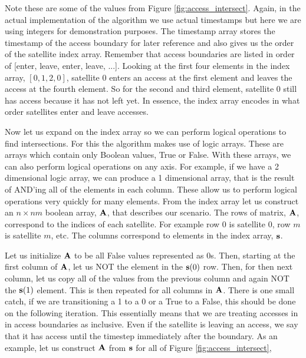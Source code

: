 Note these are some of the values from Figure \ref{fig:access_intersect}.
Again, in the actual implementation of the algorithm we use actual timestamps
but here we are using integers for demonstration purposes. The timestamp array
stores the timestamp of the access boundary for later reference and also gives
us the order of the satellite index array. Remember that access boundaries are
listed in order of [enter, leave, enter, leave, ...]. Looking at the first four
elements in the index array, $[0, 1, 2, 0]$, satellite 0 enters an access at
the first element and leaves the access at the fourth element. So for the
second and third element, satellite 0 still has access because it has not left
yet. In essence, the index array encodes in what order satellites enter and
leave accesses. 

Now let us expand on the index array so we can perform logical operations to
find intersections. For this the algorithm makes use of logic arrays.  These
are arrays which contain only Boolean values, True or False. With these arrays,
we can also perform logical operations on any axis. For example, if we have a 2
dimensional logic array, we can produce a 1 dimensional array, that is the
result of AND'ing all of the elements in each column. These allow us to perform
logical operations very quickly for many elements. From the index array let us
construct an $n\times nm$ boolean array, $\bm{\mathrm{A}}$, that describes our scenario.
The rows of matrix, $\bm{\mathrm{A}}$, correspond to the indices of each satellite.  For
example row 0 is satellite 0, row $m$ is satellite $m$, etc. The columns
correspond to elements in the index array, $\bm{\mathrm{s}}$.

Let us initialize $\bm{\mathrm{A}}$ to be all False values represented as 0s. Then,
starting at the first column of $\bm{\mathrm{A}}$, let us NOT the element in the
$\bm{\mathrm{s}}(0)$ row.  Then, for then next column, let us copy all of the values
from the previous column and again NOT the $\bm{\mathrm{s}}(1)$ element. This is then
repeated for all columns in $\bm{\mathrm{A}}$. There is one small catch, if we are
transitioning a 1 to a 0 or a True to a False, this should be done on the
following iteration. This essentially means that we are treating accesses in in
access boundaries as inclusive. Even if the satellite is leaving an access, we
say that it has access until the timestep immediately after the boundary. As an
example, let us construct $\bm{\mathrm{A}}$ from $\bm{\mathrm{s}}$ for all of Figure
\ref{fig:access_intersect},


